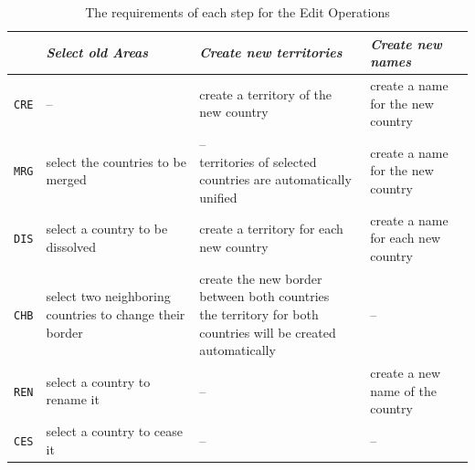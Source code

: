 \begin{table}[H]
\begin{center}
\begin{tabular}{m{0.9cm} m{4.2cm} m{4.2cm} m{3.5cm}}
  \toprule

  &
  \emph{Select old Areas} &
  \emph{Create new territories} &
  \emph{Create new names} \\

  \midrule
  \texttt{CRE} &
  -- &
  create a territory of the new country &
  create a name for the new country \\

  \midrule
  \texttt{MRG} &
  select the countries to be merged &
  \pbox{4.4cm}{--\\
  \footnotesize{territories of selected countries are automatically unified}} &
  create a name for the new country
  \\

  \midrule
  \texttt{DIS} &
  select a country to be \mbox{dissolved} &
  create a territory for each new country &
  create a name for each new country \\

  \midrule
  \texttt{CHB} &
  select two neighboring countries to change their border &
  \pbox{4.4cm}{create the new border between both countries \\
  \footnotesize{the territory for both countries will be created automatically}}  &
  -- \\

  \midrule
  \texttt{REN} &
  select a country to rename it &
  -- &
  create a new name of the country \\

  \midrule
  \texttt{CES} &
  select a country to cease it &
  -- &
  -- \\

  \bottomrule
\end{tabular}
\caption{The requirements of each step for the Edit Operations}
\label{tab:editoperations_in_worklow}
\end{center}
\end{table}



\vspace{-1.0em}

